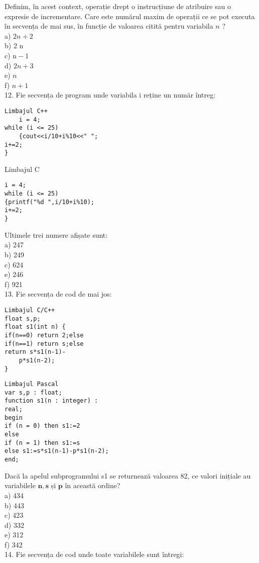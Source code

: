 Definim, în acest context, operație drept o instrucțiune de atribuire sau o expresie de incrementare. Care este numărul maxim de operații ce se pot executa în secvența de mai sus, în funcție de valoarea citită pentru variabila $n$ ?\\
a) $2 n+2$\\
b) 2 n\\
c) $\mathrm{n}-1$\\
d) $2 n+3$\\
e) $n$\\
f) $n+1$\\
12. Fie secvența de program unde variabila i reține un număr întreg:

\begin{verbatim}
Limbajul C++
    i = 4;
while (i <= 25)
    {cout<<i/10+i%10<<" ";
i+=2;
}
\end{verbatim}

Limbajul C

\begin{verbatim}
i = 4;
while (i <= 25)
{printf("%d ",i/10+i%10);
i+=2;
}
\end{verbatim}

Ultimele trei numere afișate sunt:\\
a) 247\\
b) 249\\
c) 624\\
e) 246\\
f) 921\\
13. Fie secvența de cod de mai jos:

\begin{verbatim}
Limbajul C/C++
float s,p;
float s1(int n) {
if(n==0) return 2;else
if(n==1) return s;else
return s*s1(n-1)-
    p*s1(n-2);
}
\end{verbatim}

\begin{verbatim}
Limbajul Pascal
var s,p : float;
function s1(n : integer) :
real;
begin
if (n = 0) then s1:=2
else
if (n = 1) then s1:=s
else s1:=s*s1(n-1)-p*s1(n-2);
end;
\end{verbatim}

Dacă la apelul subprogramului s1 se returnează valoarea 82, ce valori inițiale au variabilele $\mathbf{n}, \mathbf{s}$ și $\mathbf{p}$ în această ordine?\\
a) 434\\
b) 443\\
c) 423\\
d) 332\\
e) 312\\
f) 342\\
14. Fie secvența de cod unde toate variabilele sunt întregi:

